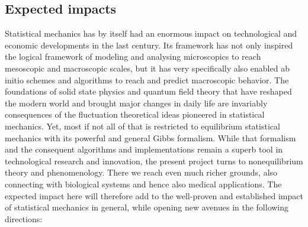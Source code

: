 \subsection{Expected impacts}

Statistical mechanics has by itself had an enormous impact on technological and economic developments in the last century.  Its framework has not only inspired the logical framework of modeling and analysing microscopics to reach mesoscopic and macroscopic scales, but it has very specifically also enabled ab initio schemes and algorithms to reach and predict macroscopic behavior.  The foundations of solid state physics and quantum field theory that have reshaped the modern world and brought major changes in daily life are invariably consequences of the fluctuation theoretical ideas pioneered in statistical mechanics.  Yet, most if not all of that is restricted to equilibrium statistical mechanics with its powerful and general Gibbs formalism.  While that formalism and the consequent algorithms and implementations remain a superb tool in technological research and innovation, the present project turns to nonequilibrium theory and phenomenology.  There we reach even much richer grounds, also connecting with biological systems and hence also medical applications.  The expected impact here will therefore add to the well-proven and established impact of statistical mechanics in general, while opening new avenues in the following directions:

